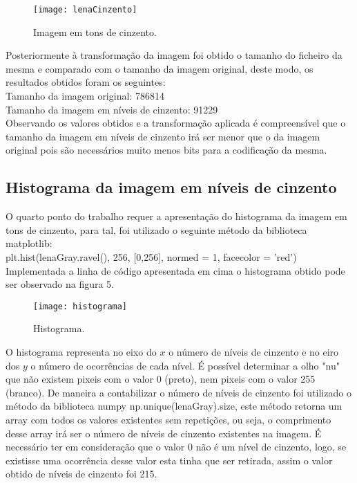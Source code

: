 \documentclass[12pt,a4paper]{article}
\begin{document}
\clearpage

\begin{figure}
\texttt{[image: lenaCinzento]}
\centering
\caption{Imagem em tons de cinzento.}
\end{figure}

Posteriormente à transformação da imagem foi obtido o tamanho do ficheiro da mesma e comparado com o tamanho da imagem original, deste modo, os resultados obtidos foram os seguintes:\\
\newline
Tamanho da imagem original: 786814\\
Tamanho da imagem em níveis de cinzento: 91229\\
\newline
Observando os valores obtidos e a transformação aplicada é compreensível que o tamanho da imagem em níveis de cinzento irá ser menor que o da imagem original pois são necessários muito menos bits para a codificação da mesma.
\clearpage

\subsection{Histograma da imagem em níveis de cinzento}
O quarto ponto do trabalho requer a apresentação do histograma da imagem em tons de cinzento, para tal, foi utilizado o seguinte método da biblioteca matplotlib:\\
\newline
plt.hist(lenaGray.ravel(), 256, [0,256], normed = 1, facecolor = 'red')\\
\newline
Implementada a linha de código apresentada em cima o histograma obtido pode ser observado na figura 5.
\begin{figure}[h]
\texttt{[image: histograma]}
\centering
\caption{Histograma.}
\end{figure}

O histograma representa no eixo do $x$ o número de níveis de cinzento e no eiro dos $y$ o número de ocorrências de cada nível. É possível determinar a olho "nu" que não existem pixeis com o valor 0 (preto), nem pixeis com o valor 255 (branco). De maneira a contabilizar o número de níveis de cinzento foi utilizado o método da biblioteca numpy np.unique(lenaGray).size, este método retorna um array com todos os valores existentes sem repetições, ou seja, o comprimento desse array irá ser o número de níveis de cinzento existentes na imagem. É necessário ter em consideração que o valor 0 não é um nível de cinzento, logo, se existisse uma ocorrência desse valor esta tinha que ser retirada, assim o valor obtido de níveis de cinzento foi 215.
\end{document}
